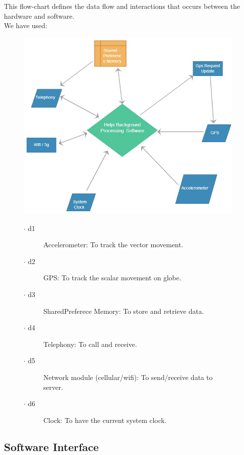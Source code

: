 This flow-chart defines the data flow and interactions that occurs between the hardware and software.\\
We have used:
\begin{figure}[h]
	\centering
	\includegraphics[height=0.41\textheight]{fig01/d_harint}
	\label{fig:RHP01}

\begin{description}
\item[$\cdot$ d1] Accelerometer: To track the vector movement.
\item[$\cdot$ d2] GPS: To track the scalar movement on globe.
\item[$\cdot$ d3] SharedPreferece Memory: To store and retrieve data.
\item[$\cdot$ d4] Telephony: To call and receive.
\item[$\cdot$ d5] Network module (cellular/wifi): To send/receive data to server.
\item[$\cdot$ d6] Clock: To have the current system clock.
\end{description}
\end{figure}

\newpage
\subsection{Software Interface}
\label{subsec:subsec03}


